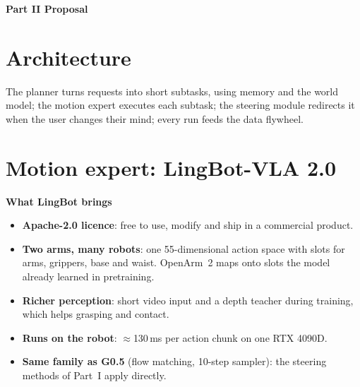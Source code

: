 \documentclass[11pt,a4paper]{article}
\newcommand{\sub}[1]{\par\needspace{4\baselineskip}\smallskip\noindent\textbf{#1}\par}
\newcommand{\parttitle}[1]{\clearpage\begin{center}{\Large\bfseries #1}\end{center}\vspace{2mm}}
\begin{document}
\parttitle{Part II \quad Proposal}

\section{Architecture}
\label{sec:arch}
\begin{center}
\end{center}
The planner turns requests into short subtasks, using memory and the world model; the motion expert executes each subtask; the steering module redirects it when the user changes their mind; every run feeds the data flywheel.

\section{Motion expert: LingBot-VLA 2.0}
\label{sec:prop-vla}
\sub{What LingBot brings}
\begin{itemize}
\item \textbf{Apache-2.0 licence}: free to use, modify and ship in a commercial product.
\item \textbf{Two arms, many robots}: one 55-dimensional action space with slots for arms, grippers, base and waist. OpenArm~2 maps onto slots the model already learned in pretraining.
\item \textbf{Richer perception}: short video input and a depth teacher during training, which helps grasping and contact.
\item \textbf{Runs on the robot}: $\approx$130\,ms per action chunk on one RTX 4090D.
\item \textbf{Same family as G0.5} (flow matching, 10-step sampler): the steering methods of Part~I apply directly.
\end{itemize}
\end{document}
